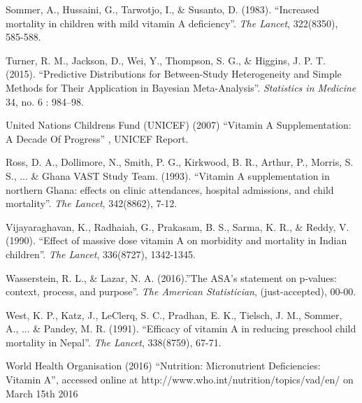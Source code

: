\documentclass[12pt]{article}
\begin{document}
\begin{thebibliography}{99}
 Sommer, A., Hussaini, G., Tarwotjo, I., \& Susanto, D. (1983). ``Increased mortality in children with mild vitamin A deficiency''. \emph{The Lancet}, 322(8350), 585-588.

 Turner, R. M., Jackson, D., Wei, Y., Thompson, S. G., \& Higgins, J. P. T. (2015). ``Predictive Distributions for Between-Study Heterogeneity and Simple Methods for Their Application in Bayesian Meta-Analysis''. \emph{Statistics in Medicine} 34, no. 6 : 984–98.

 United Nations Childrens Fund (UNICEF) (2007) ``Vitamin A Supplementation: A Decade Of Progress'' , UNICEF Report. 

 Ross, D. A., Dollimore, N., Smith, P. G., Kirkwood, B. R., Arthur, P., Morris, S. S., ... \& Ghana VAST Study Team. (1993). ``Vitamin A supplementation in northern Ghana: effects on clinic attendances, hospital admissions, and child mortality''. \emph{The Lancet}, 342(8862), 7-12.

 Vijayaraghavan, K., Radhaiah, G., Prakasam, B. S., Sarma, K. R., \& Reddy, V. (1990). ``Effect of massive dose vitamin A on morbidity and mortality in Indian children''. \emph{The Lancet}, 336(8727), 1342-1345.

 Wasserstein, R. L., \& Lazar, N. A. (2016).''The ASA's statement on p-values: context, process, and purpose''. \emph{The American Statistician}, (just-accepted), 00-00.

 West, K. P., Katz, J., LeClerq, S. C., Pradhan, E. K., Tielsch, J. M., Sommer, A., ... \& Pandey, M. R. (1991). ``Efficacy of vitamin A in reducing preschool child mortality in Nepal''. \emph{The Lancet}, 338(8759), 67-71.

 World Health Organisation (2016) ``Nutrition: Micronutrient Deficiencies: Vitamin A'', accessed online at http://www.who.int/nutrition/topics/vad/en/ on March 15th 2016


\end{thebibliography}


\pagebreak


\end{document}
